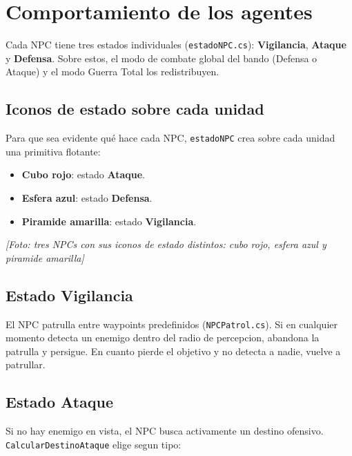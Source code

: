 \documentclass[12pt,a4paper]{article}
\newcommand{\fotoplaceholder}[1]{%
    \par\medskip\noindent%
    \begin{center}%
    \begin{tcolorbox}[
        colback=fotobg,
        colframe=fotoborder,
        boxrule=0.8pt,
        arc=2pt,
        width=0.85\textwidth,
        halign=center,
        valign=center,
        height=2.4cm
    ]
    \itshape\color{gray} [Foto: #1]
    \end{tcolorbox}%
    \end{center}\medskip%
}
\begin{document}
\section{Comportamiento de los agentes}

Cada NPC tiene tres estados individuales (\texttt{estadoNPC.cs}):
\textbf{Vigilancia}, \textbf{Ataque} y \textbf{Defensa}. Sobre estos,
el modo de combate global del bando (Defensa o Ataque) y el modo
Guerra Total los redistribuyen.

\subsection{Iconos de estado sobre cada unidad}

Para que sea evidente qué hace cada NPC, \texttt{estadoNPC} crea sobre
cada unidad una primitiva flotante:

\begin{itemize}[leftmargin=1.5em]
    \item \textbf{Cubo rojo}: estado \textbf{Ataque}.
    \item \textbf{Esfera azul}: estado \textbf{Defensa}.
    \item \textbf{Piramide amarilla}: estado \textbf{Vigilancia}.
\end{itemize}

\fotoplaceholder{tres NPCs con sus iconos de estado distintos: cubo rojo, esfera azul y piramide amarilla}

\subsection{Estado Vigilancia}

El NPC patrulla entre waypoints predefinidos (\texttt{NPCPatrol.cs}). Si
en cualquier momento detecta un enemigo dentro del radio de percepcion,
abandona la patrulla y persigue. En cuanto pierde el objetivo y no
detecta a nadie, vuelve a patrullar.

\subsection{Estado Ataque}

Si no hay enemigo en vista, el NPC busca activamente un destino
ofensivo. \texttt{CalcularDestinoAtaque} elige segun tipo:
\end{document}
